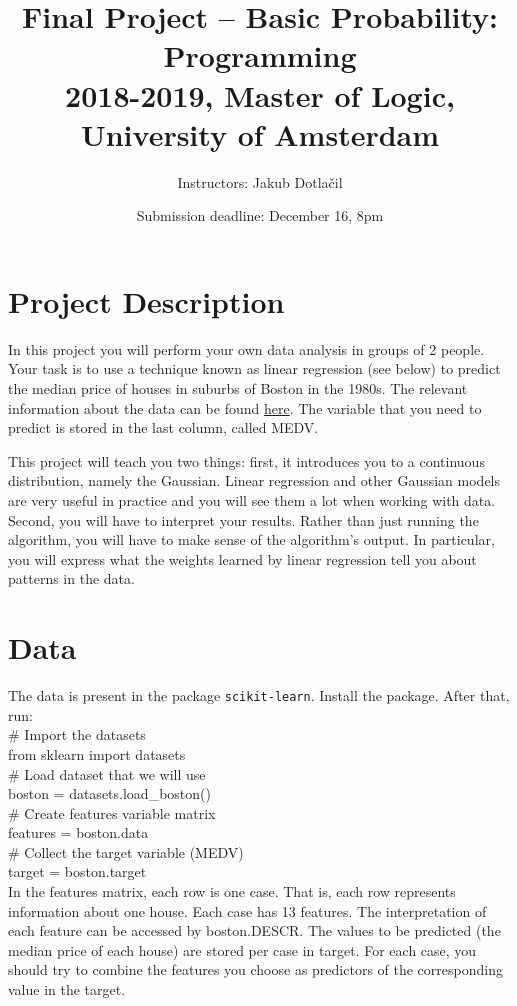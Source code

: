 \documentclass[11pt, leqno, a4paper]{article}
\title{Final Project -- Basic Probability: Programming\\[2mm]
\large{2018-2019, Master of Logic, University of Amsterdam}}
\author{Instructors: Jakub Dotla\v{c}il}
\date{Submission deadline: December 16, 8pm}
\begin{document}
\maketitle

\section{Project Description}

In this project you will perform your own data analysis in groups of 2 people. Your task is
to use a technique known as linear regression (see below) to predict the median price of houses
in suburbs of Boston in the 1980s. The relevant information about the data can be found
\href{http://www.cs.toronto.edu/\%7Edelve/data/boston/bostonDetail.html}{here}. The variable that you need
to predict is stored in the last column, called MEDV.

This project will teach you two things: first, it introduces you to a continuous distribution, namely
the Gaussian. Linear regression and other Gaussian models are very useful in practice and you will
see them a lot when working with data. Second, you will have to interpret your results. Rather than
just running the algorithm, you will have to make sense of the algorithm's output. In particular, you
will express what the weights learned by linear regression tell you about patterns in the data.

\section{Data}

The data is present in the package \texttt{scikit-learn}. Install the package. After that, run:\\
\# Import the datasets\\
from sklearn import datasets\\[1em]
\# Load dataset that we will use\\
boston = datasets.load\_boston()\\[1em]
\# Create features variable matrix\\
features = boston.data\\[1em]
\# Collect the target variable (MEDV)\\
target = boston.target\\[1em]

In the features matrix, each row is one case. That is, each row represents information about one house. Each case has 13 features. The interpretation of each feature can be accessed by boston.DESCR. The values to be predicted (the median price of each house) are stored per case in target. For each case, you should try to combine the features you choose as predictors of the corresponding value in the target.
\end{document}
